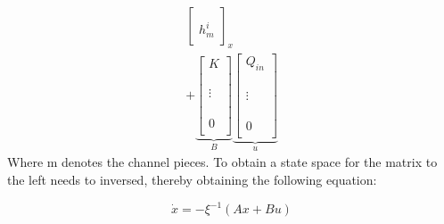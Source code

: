 \begin{equation}
\begin{aligned}
{\begin{bmatrix}
					\\
					\\
		h_{m}^{i}\\
		\end{bmatrix}}_{x}
		\\
	+ \underbrace{\begin{bmatrix}
		K \\
		\\
					\\
					\\
		\vdots		\\
					\\
					\\
					\\
		0\\
		\end{bmatrix}}_{B}
		\underbrace{\begin{bmatrix}
		Q_{in} \\
		\\
					\\
					\\
		\vdots		\\
					\\
					\\
					\\
		0\\
		\end{bmatrix}}_{u}
	\end{aligned}
\end{equation}
Where m denotes the channel pieces.  
To obtain a state space for the matrix to the left needs to inversed, thereby obtaining the following equation:

\begin{equation}
	\dot{x} = -\xi^{-1} (Ax+Bu)
\end{equation}


